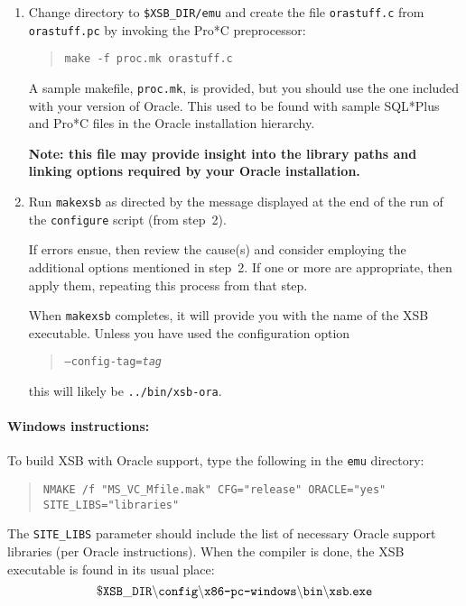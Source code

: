 \begin{enumerate}
Note the final message that {\tt configure} produces before
completing.  It indicates how you should invoke \texttt{makexsb} to
build an Oracle-enabled version of XSB (step~4).

\item Change directory to \texttt{\$XSB\_DIR/emu} and create the file
\texttt{orastuff.c} from \texttt{orastuff.pc} by invoking the Pro*C
preprocessor:
\begin{quote}
	{\tt make -f proc.mk orastuff.c}
\end{quote}
A sample makefile, \texttt{proc.mk}, is provided, but you should use
the one included with your version of Oracle.  This used to be found
with sample SQL*Plus and Pro*C files in the Oracle installation
hierarchy.

\textbf{Note: this file may provide insight into the library paths and
linking options required by your Oracle installation.}

\item Run {\tt makexsb} as directed by the message displayed at the
end of the run of the \texttt{configure} script (from step~2).

If errors ensue, then review the cause(s) and consider employing the
additional options mentioned in step~2.  If one or more are
appropriate, then apply them, repeating this process from that step.

When {\tt makexsb} completes, it will provide you with the name of the
XSB executable.  Unless you have used the configuration option
\begin{quote}
	{\tt --config-tag=\emph{tag}}
\end{quote}
this will likely be {\tt ../bin/xsb-ora}.
\end{enumerate}

\paragraph{Windows instructions:}
To build XSB with Oracle support, type the following in the {\tt emu}
directory: 
\begin{quote}
 {\tt NMAKE /f "MS\_VC\_Mfile.mak" CFG="release" ORACLE="yes" SITE\_LIBS="libraries"  }
\end{quote}
The {\tt SITE\_LIBS} parameter should include the list of necessary Oracle
support libraries (per Oracle instructions). When the compiler is done, the 
XSB executable is found in its usual place:
\[
 \tt
 \$XSB\_DIR\backslash config\backslash \mbox{\tt x86-pc-windows}\backslash bin
 \backslash xsb.exe
\]


